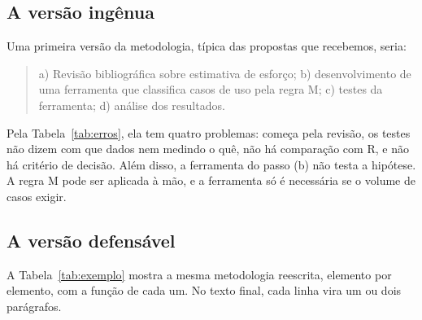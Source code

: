 \documentclass[10pt,a4paper]{extarticle}
\theoremstyle{definition}
\begin{document}
\subsection{A versão ingênua}

Uma primeira versão da metodologia, típica das propostas que recebemos, seria:

\begin{quote}
a) Revisão bibliográfica sobre estimativa de esforço; b) desenvolvimento de uma ferramenta que classifica casos de uso pela regra M; c) testes da ferramenta; d) análise dos resultados.
\end{quote}

Pela Tabela~\ref{tab:erros}, ela tem quatro problemas: começa pela revisão, os testes não dizem com que dados nem medindo o quê, não há comparação com R, e não há critério de decisão. Além disso, a ferramenta do passo (b) não testa a hipótese. A regra M pode ser aplicada à mão, e a ferramenta só é necessária se o volume de casos exigir.

\subsection{A versão defensável}

A Tabela~\ref{tab:exemplo} mostra a mesma metodologia reescrita, elemento por elemento, com a função de cada um. No texto final, cada linha vira um ou dois parágrafos.
\end{document}
